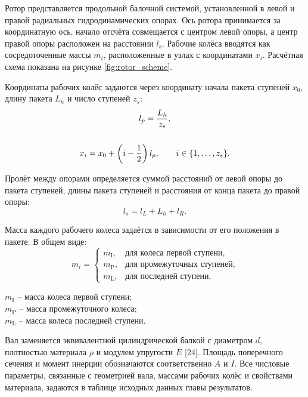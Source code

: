 Ротор представляется продольной балочной системой, установленной в левой и правой радиальных гидродинамических опорах. Ось ротора принимается за координатную ось, начало отсчёта совмещается с центром левой опоры, а центр правой опоры расположен на расстоянии $l_s$. Рабочие колёса вводятся как сосредоточенные массы $m_i$, расположенные в узлах с координатами $x_i$. Расчётная схема показана на рисунке \ref{fig:rotor_scheme}.

Координаты рабочих колёс задаются через координату начала пакета ступеней $x_0$, длину пакета $L_h$ и число ступеней $z_s$:
\begin{gather}
l_p=\frac{L_h}{z_s},\\[\baselineskip]
x_i=x_0+\left(i-\frac{1}{2}\right)l_p,\qquad i\in\{1,\ldots,z_s\}.
    \label{eq:stage_coordinates_cns105}
\end{gather}

Пролёт между опорами определяется суммой расстояний от левой опоры до пакета ступеней, длины пакета ступеней и расстояния от конца пакета до правой опоры:
\begin{equation}
    l_s=l_L+L_h+l_R.
    \label{eq:span_cns105}
\end{equation}

Масса каждого рабочего колеса задаётся в зависимости от его положения в пакете. В общем виде:
\begin{equation}
    m_i=\begin{cases}
    m_{\text{I}}, & \text{для колеса первой ступени},\\
    m_{\text{P}}, & \text{для промежуточных ступеней},\\
    m_{\text{L}}, & \text{для последней ступени},
    \end{cases}
    \label{eq:stage_masses}
\end{equation}
\begin{conditions}
$m_{\text{I}}$ -- масса колеса первой ступени;\\
$m_{\text{P}}$ -- масса промежуточного колеса;\\
$m_{\text{L}}$ -- масса колеса последней ступени.
\end{conditions}

Вал заменяется эквивалентной цилиндрической балкой с диаметром $d$, плотностью материала $\rho$ и модулем упругости $E$ [24]. Площадь поперечного сечения и момент инерции обозначаются соответственно $A$ и $I$. Все числовые параметры, связанные с геометрией вала, массами рабочих колёс и свойствами материала, задаются в таблице исходных данных главы результатов.

